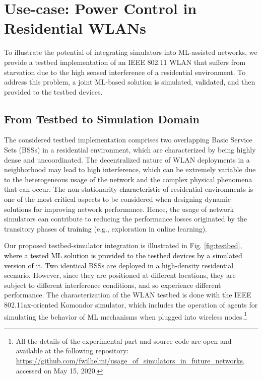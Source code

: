 \documentclass[journal]{IEEEtran}
\begin{document}
	\section{Use-case: Power Control in Residential WLANs}	
	To illustrate the potential of integrating simulators \textcolor{black}{into} ML-assisted networks, we provide a testbed implementation of an IEEE 802.11 WLAN that suffers from starvation due to the high sensed interference of a residential environment. To address this problem, a joint ML-based solution is simulated, \textcolor{black}{validated,} and then provided to the testbed devices.
	
	\subsection{From Testbed to Simulation Domain}
	The considered testbed implementation comprises two overlapping Basic Service Sets (BSSs) in a residential environment, which are characterized by being highly dense and uncoordinated. The decentralized nature of WLAN deployments in a neighborhood may lead to high interference, which can be extremely variable due to the heterogeneous usage of the network and the complex physical phenomena that can occur. The non-stationarity \textcolor{black}{characteristic} of residential environments \textcolor{black}{is one of the most critical} aspects to be considered when designing dynamic solutions for improving network performance. Hence, the usage of network simulators can contribute to reducing the performance losses originated by \textcolor{black}{the} transitory phases \textcolor{black}{of training} (e.g., exploration in online learning).

	Our proposed testbed-simulator integration is illustrated in Fig. \ref{fig:testbed},\textcolor{black}{ where a tested ML solution is provided to the testbed devices by a simulated version of it}. Two identical BSSs are deployed in a high-density residential scenario. However, since they are positioned at different locations, they are subject to different interference conditions, and so experience different performance. The characterization of the WLAN testbed is done with the IEEE 802.11ax-oriented Komondor simulator, which includes the operation of agents for simulating the behavior of ML mechanisms when plugged into wireless nodes.\footnote{All the details of the experimental part and source code are open and available at the following repository: \url{https://github.com/fwilhelmi/usage_of_simulators_in_future_networks}, accessed on May 15, 2020.}
		
\end{document}

